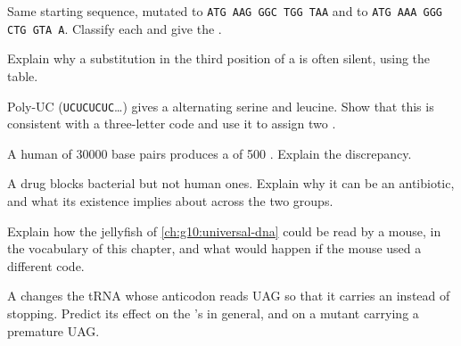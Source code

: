 \begin{exercise}[$\star\star$]\label{exo:g11:gene-expression:8}
Same starting sequence, mutated to \texttt{ATG AAG GGC TGG TAA} and
to \texttt{ATG AAA GGG CTG GTA A}. Classify each and give the .
\end{exercise}

\begin{exercise}[$\star\star$]\label{exo:g11:gene-expression:9}
Explain why a substitution in the third position of a  is often
silent, using the table.
\end{exercise}

\begin{exercise}[$\star\star$]\label{exo:g11:gene-expression:10}
Poly-UC  (\texttt{UCUCUCUC}\dots) gives a  alternating
serine and leucine. Show that this is consistent with a three-letter
code and use it to assign two .
\end{exercise}

\begin{exercise}[$\star\star$]\label{exo:g11:gene-expression:11}
A human  of \num{30000} base pairs produces a  of 500
. Explain the discrepancy.
\end{exercise}

\begin{exercise}[$\star\star\star$]\label{exo:g11:gene-expression:12}
A drug blocks bacterial  but not human ones. Explain why it
can be an antibiotic, and what its existence implies about 
across the two groups.
\end{exercise}

\begin{exercise}[$\star\star\star$]\label{exo:g11:gene-expression:13}
Explain how the jellyfish  of \cref{ch:g10:universal-dna} could be
read by a mouse, in the vocabulary of this chapter, and what would
happen if the mouse used a different code.
\end{exercise}

\begin{exercise}[$\star\star\star$]\label{exo:g11:gene-expression:14}
A  changes the tRNA whose anticodon reads UAG so that it
carries an  instead of stopping. Predict its effect on the
's  in general, and on a mutant  carrying a premature
UAG.
\end{exercise}

